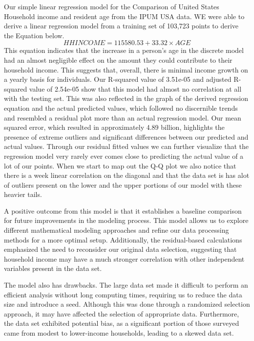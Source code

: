 \documentclass[
]{article}
\begin{document}
Our simple linear regression model for the Comparison of United States
Household income and resident age from the IPUM USA data. WE were able
to derive a linear regression model from a training set of 103,723
points to derive the Equation below. \[
HHINCOME = 115580.53 + 33.32 \times AGE
\] This equation indicates that the increase in a person's age in the
discrete model had an almost negligible effect on the amount they could
contribute to their household income. This suggests that, overall, there
is minimal income growth on a yearly basis for individuals. Our
R-squared value of 3.51e-05 and adjusted R-squared value of 2.54e-05
show that this model had almost no correlation at all with the testing
set. This was also reflected in the graph of the derived regression
equation and the actual predicted values, which followed no discernible
trends and resembled a residual plot more than an actual regression
model. Our mean squared error, which resulted in approximately 4.89
billion, highlights the presence of extreme outliers and significant
differences between our predicted and actual values. Through our
residual fitted values we can further visualize that the regression
model very rarely ever comes close to predicting the actual value of a
lot of our points. When we start to map out the Q-Q plot we also notice
that there is a week linear correlation on the diagonal and that the
data set is has alot of outliers present on the lower and the upper
portions of our model with these heavier tails.

A positive outcome from this model is that it establishes a baseline
comparison for future improvements in the modeling process. This model
allows us to explore different mathematical modeling approaches and
refine our data processing methods for a more optimal setup.
Additionally, the residual-based calculations emphasized the need to
reconsider our original data selection, suggesting that household income
may have a much stronger correlation with other independent variables
present in the data set.

The model also has drawbacks. The large data set made it difficult to
perform an efficient analysis without long computing times, requiring us
to reduce the data size and introduce a seed. Although this was done
through a randomized selection approach, it may have affected the
selection of appropriate data. Furthermore, the data set exhibited
potential bias, as a significant portion of those surveyed came from
modest to lower-income households, leading to a skewed data set.
\end{document}
